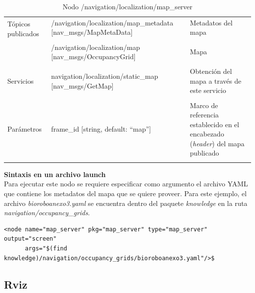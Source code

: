 \documentclass[a4paper,usenames,dvipsnames,svgnames,table]{book}
\begin{document}
\begin{table}[H]
\begin{center}
\begin{tabular}{|l|p{6cm}|p{5cm}|}%
\hline

\multirow{2}{*}{Tópicos publicados}
& /navigation/localization/map\_metadata [nav\_msgs/MapMetaData] & Metadatos del mapa \\
& & \\
& /navigation/localization/map [nav\_msgs/OccupancyGrid] & Mapa  \\
& & \\
\cline{1-3}
 
Servicios
& navigation/localization/static\_map [nav\_msgs/GetMap] & Obtención del mapa a través de este servicio \\
& & \\
\hline

Parámetros
& frame\_id [string, default: ``map''] & Marco de referencia establecido en el encabezado (\textit{header}) del mapa publicado \\
& & \\
\hline

\end{tabular}
\caption{Nodo /navigation/localization/map\_server}
\label{map server node}
\end{center}
\end{table}

\textbf{Sintaxis en un archivo launch}\\
Para ejecutar este nodo se requiere especificar como argumento el archivo YAML que contiene los metadatos del mapa que se quiere proveer. Para este ejemplo, el archivo \textit{bioroboanexo3.yaml} se encuentra dentro del paquete \textit{knowledge} en la ruta \textit{navigation/occupancy\_grids}.\\
\begin{verbatim}
<node name="map_server" pkg="map_server" type="map_server" output="screen" 
      args="$(find knowledge)/navigation/occupancy_grids/bioroboanexo3.yaml"/>$
\end{verbatim}

\subsection{Rviz}
\end{document}
